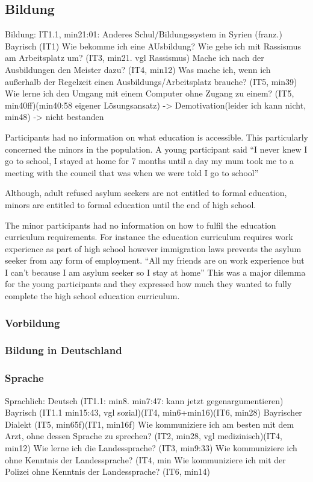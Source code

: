 
\subsection{Bildung}

Bildung:
    IT1.1, min21:01: Anderes Schul/Bildungssystem in Syrien (franz.)
    Bayrisch (IT1)
    Wie bekomme ich eine AUsbildung?
    Wie gehe ich mit Rassismus am Arbeitsplatz um? (IT3, min21. vgl Rassismus)
    Mache ich nach der Ausbildungen den Meister dazu? (IT4, min12)
    Was mache ich, wenn ich außerhalb der Regelzeit einen Ausbildungs/Arbeitsplatz brauche? (IT5, min39)
    Wie lerne ich den Umgang mit einem Computer ohne Zugang zu einem? (IT5, min40ff)(min40:58 eigener              Lösungsansatz) -> Demotivation(leider ich kann nicht, min48) -> nicht bestanden
    
    
Participants had no information on what education is
accessible. This particularly concerned the minors in the
population. A young participant said
“I never knew I go to school, I stayed at home for 7
months until a day my mum took me to a meeting
with the council that was when we were told I go to
school”

Although, adult refused asylum seekers are not entitled to
formal education, minors are entitled to formal education
until the end of high school.

The minor participants had no information on how to fulfil
the education curriculum requirements. For instance the
education curriculum requires work experience as part of
high school however immigration laws prevents the asylum
seeker from any form of employment.
“All my friends are on work experience but I can’t
because I am asylum seeker so I stay at home”
This was a major dilemma for the young participants and
they expressed how much they wanted to fully complete the
high school education curriculum.        

\subsubsection{Vorbildung}
\subsubsection{Bildung in Deutschland}
\subsubsection{Sprache}
Sprachlich:
    Deutsch (IT1.1: min8. min7:47: kann jetzt gegenargumentieren)
    Bayrisch (IT1.1 min15:43, vgl sozial)(IT4, min6+min16)(IT6, min28)
            Bayrischer Dialekt (IT5, min65f)(IT1, min16f)
    Wie kommuniziere ich am besten mit dem Arzt, ohne dessen Sprache zu sprechen? (IT2, min28, vgl medizinisch)(IT4, min12)
    Wie lerne ich die Landessprache? (IT3, min9:33)
    Wie kommuniziere ich ohne Kenntnis der Landessprache? (IT4, min
    Wie kommuniziere ich mit der Polizei ohne Kenntnis der Landessprache? (IT6, min14)
    

